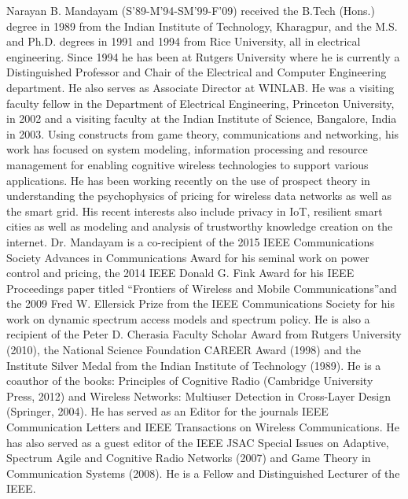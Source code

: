 \documentclass{ieeeaccess}
\begin{document}
\begin{IEEEbiography}{Narayan B. Mandayam} (S'89-M'94-SM'99-F'09) received the B.Tech (Hons.) degree in 1989
from the Indian Institute of Technology, Kharagpur, and
the M.S. and Ph.D. degrees in 1991 and 1994 from Rice
University, all in electrical engineering. Since 1994 he has
been at Rutgers University where he is currently a Distinguished
Professor and Chair of the Electrical and Computer
Engineering department. He also serves as Associate Director
at WINLAB. He was a visiting faculty fellow in the Department
of Electrical Engineering, Princeton University, in
2002 and a visiting faculty at the Indian Institute of Science,
Bangalore, India in 2003. Using constructs from game theory,
communications and networking, his work has focused
on system modeling, information processing and resource
management for enabling cognitive wireless technologies to
support various applications. He has been working recently
on the use of prospect theory in understanding the psychophysics
of pricing for wireless data networks as well as
the smart grid. His recent interests also include privacy in
IoT, resilient smart cities as well as modeling and analysis of
trustworthy knowledge creation on the internet. Dr. Mandayam
is a co-recipient of the 2015 IEEE Communications
Society Advances in Communications Award for his seminal
work on power control and pricing, the 2014 IEEE Donald
G. Fink Award for his IEEE Proceedings paper titled
``Frontiers of Wireless and Mobile Communications''and
the 2009 Fred W. Ellersick Prize from the IEEE Communications
Society for his work on dynamic spectrum access
models and spectrum policy. He is also a recipient of the
Peter D. Cherasia Faculty Scholar Award from Rutgers University
(2010), the National Science Foundation CAREER
Award (1998) and the Institute Silver Medal from the Indian
Institute of Technology (1989). He is a coauthor of the
books: Principles of Cognitive Radio (Cambridge University
Press, 2012) and Wireless Networks: Multiuser Detection
in Cross-Layer Design (Springer, 2004). He has served
as an Editor for the journals IEEE Communication Letters
and IEEE Transactions on Wireless Communications. He
has also served as a guest editor of the IEEE JSAC Special
Issues on Adaptive, Spectrum Agile and Cognitive Radio
Networks (2007) and Game Theory in Communication Systems
(2008). He is a Fellow and Distinguished Lecturer of
the IEEE.
\end{IEEEbiography}
\end{document}
